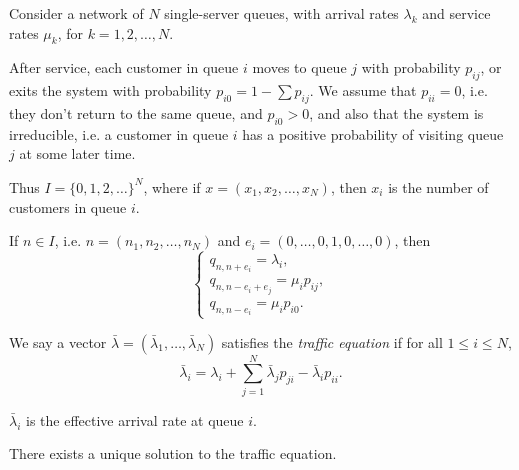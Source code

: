 \documentclass[12pt]{article}
\begin{document}
Consider a network of $N$ single-server queues, with arrival rates $\lambda_k$ and service rates $\mu_k$, for $k = 1, 2, \ldots, N$.

After service, each customer in queue $i$ moves to queue $j$ with probability $p_{ij}$, or exits the system with probability $p_{i0} = 1 - \sum p_{ij}$. We assume that $p_{ii} = 0$, i.e. they don't return to the same queue, and $p_{i0} > 0$, and also that the system is irreducible, i.e. a customer in queue $i$ has a positive probability of visiting queue $j$ at some later time.

Thus $I = \{0, 1, 2, \ldots\}^{N}$, where if $x = (x_1, x_2, \ldots, x_N)$, then $x_i$ is the number of customers in queue $i$.

If $n \in I$, i.e. $n = (n_1, n_2, \ldots, n_N)$ and $e_i = (0, \ldots, 0, 1, 0, \ldots, 0)$, then
\[
\begin{cases}
	q_{n,n+e_i} = \lambda_i, \\
	q_{n,n-e_i+e_j} = \mu_i p_{ij}, \\
	q_{n,n-e_i} = \mu_i p_{i0}.
\end{cases}
\]
\begin{definition}
	We say a vector $\bar \lambda = (\bar \lambda_1, \ldots, \bar \lambda_N)$ satisfies the \emph{traffic equation} if for all $1 \leq i \leq N$,
	\[
		\bar \lambda_i = \lambda_i + \sum_{j = 1}^{N} \bar \lambda_j p_{ji} - \bar \lambda_i p_{ii}.
	\]
\end{definition}

\begin{remark}
	$\bar \lambda_i$ is the effective arrival rate at queue $i$.
\end{remark}

\begin{lemma}
	There exists a unique solution to the traffic equation.
\end{lemma}
\end{document}

